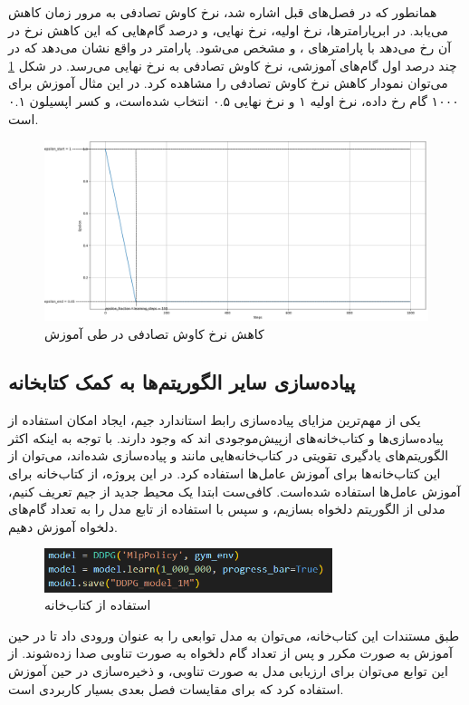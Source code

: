 همانطور که در فصل‌های قبل اشاره شد، نرخ کاوش تصادفی به مرور زمان کاهش می‌یابد.
در ابرپارامتر‌ها، نرخ اولیه، نرخ نهایی، و درصد گام‌هایی که این کاهش نرخ در آن رخ می‌دهد با 
پارامتر‌های ،  و  مشخص می‌شود.
پارامتر  در واقع نشان می‌دهد که در چند درصد اول گام‌های آموزشی، نرخ کاوش تصادفی به نرخ نهایی می‌رسد.
در شکل \ref{fig:epsilon_decay} می‌توان نمودار کاهش نرخ کاوش تصادفی را مشاهده کرد.
در این مثال آموزش برای ۱۰۰۰ گام رخ داده، نرخ اولیه ۱ و نرخ نهایی ۰.۵ انتخاب شده‌است، و کسر اپسیلون
 ۰.۱ است.
\begin{figure}[H]
    \centering
    \includegraphics[width=1.1\textwidth]{images/epsilon_decay_2.png}
    \caption{کاهش نرخ کاوش تصادفی در طی آموزش}\label{fig:epsilon_decay}
\end{figure}
\subsection{پیاده‌سازی سایر الگوریتم‌ها به کمک کتابخانه}
یکی از مهم‌ترین مزایای پیاده‌سازی رابط استاندارد جیم، ایجاد امکان استفاده از پیاده‌سازی‌ها و کتاب‌خانه‌های از‌پیش‌موجودی اند که وجود دارند.
با توجه به اینکه اکثر الگوریتم‌های یادگیری تقویتی در کتاب‌خانه‌هایی مانند  و  پیاده‌سازی شده‌اند،
می‌توان از این کتاب‌خانه‌ها برای آموزش عامل‌ها استفاده کرد.
در این پروژه، از کتاب‌خانه  برای آموزش عامل‌ها استفاده شده‌است.
کافی‌ست ابتدا یک محیط جدید از جیم تعریف کنیم، مدلی از الگوریتم دلخواه بسازیم، و سپس با استفاده از تابع 
مدل را به تعداد گام‌های دلخواه آموزش دهیم.
\begin{figure}[H]
    \centering
    \includegraphics[width=0.75\textwidth]{images/sb3.png}
    \caption{استفاده از کتاب‌خانه }\label{fig:sb3}
\end{figure}
طبق مستندات این کتاب‌خانه، می‌توان به مدل توابعی را به عنوان ورودی داد تا در حین آموزش به صورت مکرر و پس از تعداد گام دلخواه به صورت تناوبی صدا زده‌شوند.
 از این توابع می‌توان برای ارزیابی مدل به صورت تناوبی، و ذخیره‌سازی در حین آموزش استفاده کرد که برای مقایسات فصل بعدی بسیار کاربردی است.
